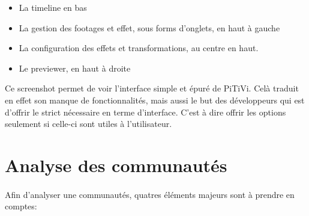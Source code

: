 \begin{itemize}

  \item {La timeline en bas}

  \item {La gestion des footages et effet, sous forms d'onglets, en haut
  à gauche}

  \item {La configuration des effets et transformations, au centre
  en haut.}

  \item {Le previewer, en haut à droite}

\end{itemize}

Ce screenshot permet de voir l'interface simple et épuré de
PiTiVi. Celà traduit en effet son manque de fonctionnalités, mais aussi
le but des développeurs qui est d'offrir le strict nécessaire en terme
d'interface. C'est à dire offrir les options seulement si celle-ci sont
utiles à l'utilisateur.

\newpage \section{Analyse des communautés}

\paragraph{}

Afin d'analyser une communautés, quatres éléments majeurs sont à
prendre en comptes:

